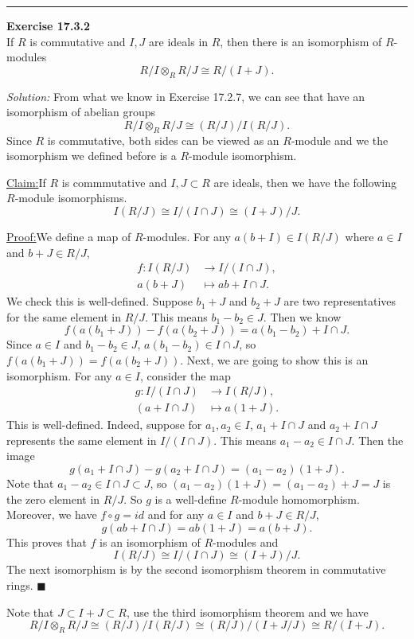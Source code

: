 \documentclass[a4paper, 12pt]{article}
\newenvironment{problem}[2][Exercise]
    { \begin{mdframed}[backgroundcolor=gray!20] \textbf{#1 #2} \\}
    {  \end{mdframed}}
\newenvironment{solution}
    {\textit{Solution:}}
    {}
\newenvironment{claim}[1]{\par\noindent\underline{Claim:}\space#1}{}
\newenvironment{claimproof}[1]{\par\noindent\underline{Proof:}\space#1}{\hfill $\blacksquare$}
\begin{document}
\noindent\rule{7in}{2.8pt}
\begin{problem}{17.3.2}
If \(R\) is commutative and \(I,J\) are ideals in \(R\), then there is an isomorphism of \(R\)-modules 
\[R/I\otimes_R R/J\cong R/(I+J).\]
\end{problem}
\begin{solution}
From what we know in Exercise 17.2.7, we can see that have an isomorphism of abelian groups 
\[R/I\otimes_R R/J\cong (R/J)/I(R/J).\]
Since \(R\) is commutative, both sides can be viewed as an \(R\)-module and we the isomorphism we defined before is a \(R\)-module isomorphism. 
\begin{claim}
If \(R\) is commmutative and \(I,J\subset R\) are ideals, then we have the following \(R\)-module isomorphisms.
\[I(R/J)\cong I/(I\cap J)\cong (I+J)/J.\]
\end{claim}
\begin{claimproof}
We define a map of \(R\)-modules. For any \(a(b+I)\in I(R/J)\) where \(a\in I\) and \(b+J\in R/J\),
\begin{align*}
	f:I(R/J)&\rightarrow I/(I\cap J),\\ 
	  a(b+J)&\mapsto ab+I\cap J.
\end{align*}
We check this is well-defined. Suppose \(b_1+J\) and \(b_2+J\) are two representatives for the same element in \(R/J\). This means \(b_1-b_2\in J\). Then we know 
\[f(a(b_1+J))-f(a(b_2+J))=a(b_1-b_2)+I\cap J.\]
Since \(a\in I\) and \(b_1-b_2\in J\), \(a(b_1-b_2)\in I\cap J\), so \(f(a(b_1+J))=f(a(b_2+J))\). Next, we are going to show this is an isomorphism. For any \(a\in I\), consider the map 
\begin{align*}
	g:I/(I\cap J )&\rightarrow I(R/J),\\ 
	  (a+I\cap J)&\mapsto a(1+J).
\end{align*}
This is well-defined. Indeed, suppose for \(a_1,a_2\in I\), \(a_1+I\cap J\) and \(a_2+I\cap J\) represents the same element in \(I/(I\cap J)\). This means \(a_1-a_2\in I\cap J\). Then the image 
\[g(a_1+I\cap J)-g(a_2+I\cap J)=(a_1-a_2)(1+J).\]
Note that \(a_1-a_2\in I\cap J\subset J\), so \((a_1-a_2)(1+J)=(a_1-a_2)+J=J\) is the zero element in \(R/J\). So \(g\) is a well-define \(R\)-module homomorphism. Moreover, we have 
\(f\circ g=id\) and for any \(a\in I\) and \(b+J\in R/J\), 
\[g(ab+I\cap J)=ab(1+J)=a(b+J).\]
This proves that \(f\) is an isomorphism of \(R\)-modules and 
\[I(R/J)\cong I/(I\cap J)\cong (I+J)/J.\]
The next isomorphism is by the second isomorphism theorem in commutative rings. 
\end{claimproof}

Note that \(J\subset I+J\subset R\), use the third isomorphism theorem and we have 
\[R/I\otimes_R R/J\cong (R/J)/I(R/J)\cong (R/J)/(I+J/J)\cong R/(I+J).\]
\end{solution}
\end{document}
